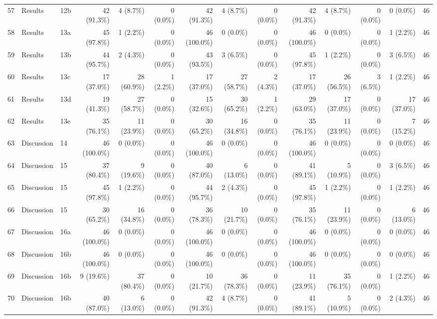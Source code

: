 \begin{longtable}{@{}rll*{11}{r}@{}}
57 & Results & 12b & 42 (91.3\%) & 4 (8.7\%) & 0 (0.0\%) & 42 (91.3\%) & 4 (8.7\%) & 0 (0.0\%) & 42 (91.3\%) & 4 (8.7\%) & 0 (0.0\%) & 0 (0.0\%) & 46 \\
58 & Results & 13a & 45 (97.8\%) & 1 (2.2\%) & 0 (0.0\%) & 46 (100.0\%) & 0 (0.0\%) & 0 (0.0\%) & 46 (100.0\%) & 0 (0.0\%) & 0 (0.0\%) & 1 (2.2\%) & 46 \\
59 & Results & 13b & 44 (95.7\%) & 2 (4.3\%) & 0 (0.0\%) & 43 (93.5\%) & 3 (6.5\%) & 0 (0.0\%) & 45 (97.8\%) & 1 (2.2\%) & 0 (0.0\%) & 3 (6.5\%) & 46 \\
60 & Results & 13c & 17 (37.0\%) & 28 (60.9\%) & 1 (2.2\%) & 17 (37.0\%) & 27 (58.7\%) & 2 (4.3\%) & 17 (37.0\%) & 26 (56.5\%) & 3 (6.5\%) & 1 (2.2\%) & 46 \\
61 & Results & 13d & 19 (41.3\%) & 27 (58.7\%) & 0 (0.0\%) & 15 (32.6\%) & 30 (65.2\%) & 1 (2.2\%) & 29 (63.0\%) & 17 (37.0\%) & 0 (0.0\%) & 17 (37.0\%) & 46 \\
62 & Results & 13e & 35 (76.1\%) & 11 (23.9\%) & 0 (0.0\%) & 30 (65.2\%) & 16 (34.8\%) & 0 (0.0\%) & 35 (76.1\%) & 11 (23.9\%) & 0 (0.0\%) & 7 (15.2\%) & 46 \\
63 & Discussion & 14 & 46 (100.0\%) & 0 (0.0\%) & 0 (0.0\%) & 46 (100.0\%) & 0 (0.0\%) & 0 (0.0\%) & 46 (100.0\%) & 0 (0.0\%) & 0 (0.0\%) & 0 (0.0\%) & 46 \\
64 & Discussion & 15 & 37 (80.4\%) & 9 (19.6\%) & 0 (0.0\%) & 40 (87.0\%) & 6 (13.0\%) & 0 (0.0\%) & 41 (89.1\%) & 5 (10.9\%) & 0 (0.0\%) & 3 (6.5\%) & 46 \\
65 & Discussion & 15 & 45 (97.8\%) & 1 (2.2\%) & 0 (0.0\%) & 44 (95.7\%) & 2 (4.3\%) & 0 (0.0\%) & 45 (97.8\%) & 1 (2.2\%) & 0 (0.0\%) & 1 (2.2\%) & 46 \\
66 & Discussion & 15 & 30 (65.2\%) & 16 (34.8\%) & 0 (0.0\%) & 36 (78.3\%) & 10 (21.7\%) & 0 (0.0\%) & 35 (76.1\%) & 11 (23.9\%) & 0 (0.0\%) & 6 (13.0\%) & 46 \\
67 & Discussion & 16a & 46 (100.0\%) & 0 (0.0\%) & 0 (0.0\%) & 46 (100.0\%) & 0 (0.0\%) & 0 (0.0\%) & 46 (100.0\%) & 0 (0.0\%) & 0 (0.0\%) & 0 (0.0\%) & 46 \\
68 & Discussion & 16b & 46 (100.0\%) & 0 (0.0\%) & 0 (0.0\%) & 46 (100.0\%) & 0 (0.0\%) & 0 (0.0\%) & 46 (100.0\%) & 0 (0.0\%) & 0 (0.0\%) & 0 (0.0\%) & 46 \\
69 & Discussion & 16b & 9 (19.6\%) & 37 (80.4\%) & 0 (0.0\%) & 10 (21.7\%) & 36 (78.3\%) & 0 (0.0\%) & 11 (23.9\%) & 35 (76.1\%) & 0 (0.0\%) & 1 (2.2\%) & 46 \\
70 & Discussion & 16b & 40 (87.0\%) & 6 (13.0\%) & 0 (0.0\%) & 42 (91.3\%) & 4 (8.7\%) & 0 (0.0\%) & 41 (89.1\%) & 5 (10.9\%) & 0 (0.0\%) & 2 (4.3\%) & 46 \\

\end{longtable}
